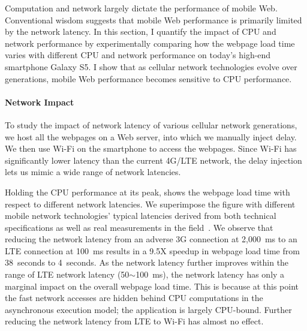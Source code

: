 Computation and network largely dictate the performance of mobile Web. Conventional wisdom suggests that mobile Web performance is primarily limited by the network latency. In this section, I quantify the impact of CPU and network performance by experimentally comparing how the webpage load time varies with different CPU and network performance on today's high-end smartphone Galaxy S5. I show that as cellular network technologies evolve over generations, mobile Web performance becomes sensitive to CPU performance.


\paragraph{Network Impact} To study the impact of network latency of various cellular network generations, we host all the webpages on a Web server, into which we manually inject delay. We then use Wi-Fi on the smartphone to access the webpages. Since Wi-Fi has significantly lower latency than the current 4G/LTE network, the delay injection lets us mimic a wide range of network latencies. 

Holding the CPU performance at its peak,  shows the webpage load time with respect to different network latencies. We superimpose the figure with different mobile network technologies' typical latencies derived from both technical specifications as well as real measurements in the field~\cite{HPBN, carrier_measure}. We observe that reducing the network latency from an adverse 3G connection at 2,000~ms to an LTE connection at 100~ms results in a 9.5X speedup in webpage load time from 38~seconds to 4~seconds. As the network latency further improves within the range of LTE network latency (50$\sim$100~ms), the network latency has only a marginal impact on the overall webpage load time. This is because at this point the fast network accesses are hidden behind CPU computations in the asynchronous execution model; the application is largely CPU-bound. Further reducing the network latency from LTE to Wi-Fi has almost no effect.

